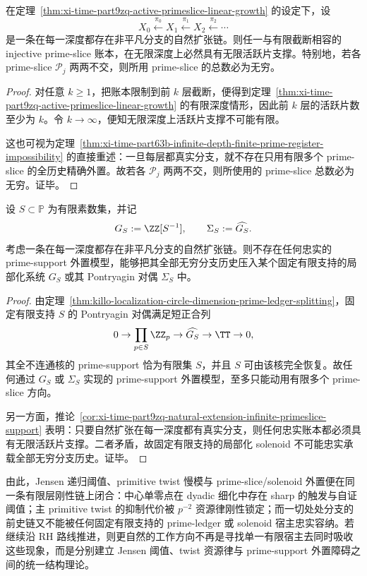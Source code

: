 \begin{corollary}\label{cor:xi-time-part9zq-natural-extension-infinite-primeslice-support}
在定理~\ref{thm:xi-time-part9zq-active-primeslice-linear-growth} 的设定下，设
\[
X_0\xleftarrow{\pi_0}X_1\xleftarrow{\pi_1}X_2\xleftarrow{\pi_2}\cdots
\]
是一条在每一深度都存在非平凡分支的自然扩张链。则任一与有限截断相容的 injective prime-slice 账本，在无限深度上必然具有无限活跃片支撑。特别地，若各 prime-slice \(\mathcal P_j\) 两两不交，则所用 prime-slice 的总数必为无穷。
\end{corollary}
\begin{proof}
对任意 \(k\ge 1\)，把账本限制到前 \(k\) 层截断，便得到定理~\ref{thm:xi-time-part9zq-active-primeslice-linear-growth} 的有限深度情形，因此前 \(k\) 层的活跃片数至少为 \(k\)。令 \(k\to\infty\)，便知无限深度上活跃片支撑不可能有限。

这也可视为定理~\ref{thm:xi-time-part63b-infinite-depth-finite-prime-register-impossibility} 的直接重述：一旦每层都真实分支，就不存在只用有限多个 prime-slice 的全历史精确外置。故若各 \(\mathcal P_j\) 两两不交，则所使用的 prime-slice 总数必为无穷。证毕。
\end{proof}

\begin{theorem}\label{thm:xi-time-part9zq-no-fixed-finite-support-solenoid-host}
设 \(S\subset\mathbb P\) 为有限素数集，并记
\[
G_S:=\ZZ[S^{-1}],
\qquad
\Sigma_S:=\widehat{G_S}.
\]
考虑一条在每一深度都存在非平凡分支的自然扩张链。则不存在任何忠实的 prime-support 外置模型，能够把其全部无穷分支历史压入某个固定有限支持的局部化系统 \(G_S\) 或其 Pontryagin 对偶 \(\Sigma_S\) 中。
\end{theorem}
\begin{proof}
由定理~\ref{thm:killo-localization-circle-dimension-prime-ledger-splitting}，固定有限支持 \(S\) 的 Pontryagin 对偶满足短正合列
\[
0\to \prod_{p\in S}\ZZ_p\to \widehat{G_S}\to \TT\to 0,
\]
其全不连通核的 prime-support 恰为有限集 \(S\)，并且 \(S\) 可由该核完全恢复。故任何通过 \(G_S\) 或 \(\Sigma_S\) 实现的 prime-support 外置模型，至多只能动用有限多个 prime-slice 方向。

另一方面，推论~\ref{cor:xi-time-part9zq-natural-extension-infinite-primeslice-support} 表明：只要自然扩张在每一深度都有真实分支，则任何忠实账本都必须具有无限活跃片支撑。二者矛盾，故固定有限支持的局部化 solenoid 不可能忠实承载全部无穷分支历史。证毕。
\end{proof}

\noindent
由此，Jensen 递归阈值、primitive twist 慢模与 prime-slice/solenoid 外置便在同一条有限层刚性链上闭合：中心单零点在 dyadic 细化中存在 sharp 的触发与自证阈值；主 primitive twist 的抑制代价被 \(p^{-2}\) 资源律刚性锁定；而一切处处分支的前史链又不能被任何固定有限支持的 prime-ledger 或 solenoid 宿主忠实容纳。若继续沿 RH 路线推进，则更自然的工作方向不再是寻找单一有限宿主去同时吸收这些现象，而是分别建立 Jensen 阈值、twist 资源律与 prime-support 外置障碍之间的统一结构理论。

\endinput

